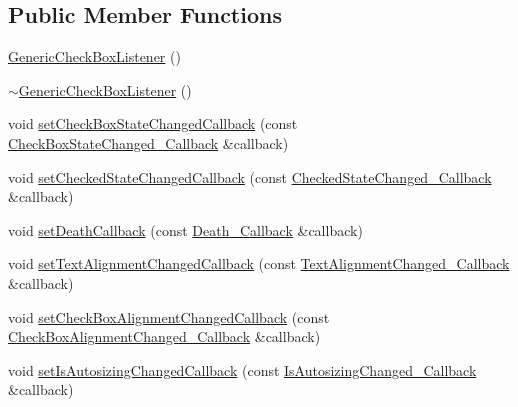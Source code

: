 \subsection*{Public Member Functions}
\begin{DoxyCompactItemize}
\item 
\mbox{\hyperlink{classec_1_1_generic_check_box_listener_a9a93b1c22ec0cb5c09fa5ddebf7498db}{Generic\+Check\+Box\+Listener}} ()
\item 
\mbox{\hyperlink{classec_1_1_generic_check_box_listener_ad9d9e7225f520345d2fa4a5f52acbe0f}{$\sim$\+Generic\+Check\+Box\+Listener}} ()
\item 
void \mbox{\hyperlink{classec_1_1_generic_check_box_listener_a9d2de6f4631eaf893dfd06fa5c760cd6}{set\+Check\+Box\+State\+Changed\+Callback}} (const \mbox{\hyperlink{classec_1_1_generic_check_box_listener_a2737c54ec6c92a1bebda7961c6bb1852}{Check\+Box\+State\+Changed\+\_\+\+Callback}} \&callback)
\item 
void \mbox{\hyperlink{classec_1_1_generic_check_box_listener_afb6cb5cadc991ce2d90151c0241dbcb4}{set\+Checked\+State\+Changed\+Callback}} (const \mbox{\hyperlink{classec_1_1_generic_check_box_listener_ad1cc68469820c8bb79f278f70a8dfbe4}{Checked\+State\+Changed\+\_\+\+Callback}} \&callback)
\item 
void \mbox{\hyperlink{classec_1_1_generic_check_box_listener_a56381c234be41818a5cc858852f9585a}{set\+Death\+Callback}} (const \mbox{\hyperlink{classec_1_1_generic_check_box_listener_acd091665058b20651d26d5f43f9e3d3e}{Death\+\_\+\+Callback}} \&callback)
\item 
void \mbox{\hyperlink{classec_1_1_generic_check_box_listener_a584545681d28e85eb54fcd0506e8a0e8}{set\+Text\+Alignment\+Changed\+Callback}} (const \mbox{\hyperlink{classec_1_1_generic_check_box_listener_ab297fca8dea2b6edefe0c8d97c24c090}{Text\+Alignment\+Changed\+\_\+\+Callback}} \&callback)
\item 
void \mbox{\hyperlink{classec_1_1_generic_check_box_listener_af2bc15c6cca49a0f044095d634607f6d}{set\+Check\+Box\+Alignment\+Changed\+Callback}} (const \mbox{\hyperlink{classec_1_1_generic_check_box_listener_a9b20541580dce7b3a1818b62524d2c6a}{Check\+Box\+Alignment\+Changed\+\_\+\+Callback}} \&callback)
\item 
void \mbox{\hyperlink{classec_1_1_generic_check_box_listener_aff6f71f8f1a241bbfd7d1b33d765824d}{set\+Is\+Autosizing\+Changed\+Callback}} (const \mbox{\hyperlink{classec_1_1_generic_check_box_listener_ae1dcd4b36cbb45a5722b5146a62b0647}{Is\+Autosizing\+Changed\+\_\+\+Callback}} \&callback)

\end{DoxyCompactItemize}
